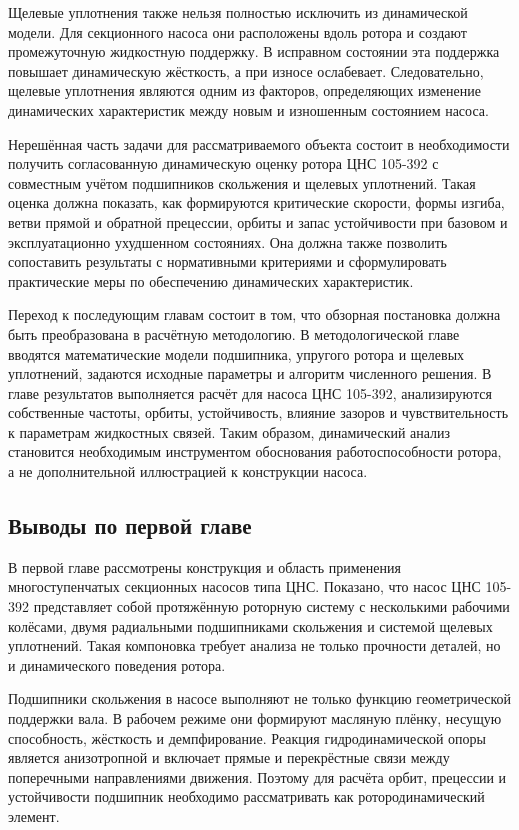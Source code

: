 Щелевые уплотнения также нельзя полностью исключить из динамической модели. Для секционного насоса они расположены вдоль ротора и создают промежуточную жидкостную поддержку. В исправном состоянии эта поддержка повышает динамическую жёсткость, а при износе ослабевает. Следовательно, щелевые уплотнения являются одним из факторов, определяющих изменение динамических характеристик между новым и изношенным состоянием насоса.

Нерешённая часть задачи для рассматриваемого объекта состоит в необходимости получить согласованную динамическую оценку ротора ЦНС 105-392 с совместным учётом подшипников скольжения и щелевых уплотнений. Такая оценка должна показать, как формируются критические скорости, формы изгиба, ветви прямой и обратной прецессии, орбиты и запас устойчивости при базовом и эксплуатационно ухудшенном состояниях. Она должна также позволить сопоставить результаты с нормативными критериями и сформулировать практические меры по обеспечению динамических характеристик.

Переход к последующим главам состоит в том, что обзорная постановка должна быть преобразована в расчётную методологию. В методологической главе вводятся математические модели подшипника, упругого ротора и щелевых уплотнений, задаются исходные параметры и алгоритм численного решения. В главе результатов выполняется расчёт для насоса ЦНС 105-392, анализируются собственные частоты, орбиты, устойчивость, влияние зазоров и чувствительность к параметрам жидкостных связей. Таким образом, динамический анализ становится необходимым инструментом обоснования работоспособности ротора, а не дополнительной иллюстрацией к конструкции насоса.

\subsection{Выводы по первой главе}

В первой главе рассмотрены конструкция и область применения многоступенчатых секционных насосов типа ЦНС. Показано, что насос ЦНС 105-392 представляет собой протяжённую роторную систему с несколькими рабочими колёсами, двумя радиальными подшипниками скольжения и системой щелевых уплотнений. Такая компоновка требует анализа не только прочности деталей, но и динамического поведения ротора.

Подшипники скольжения в насосе выполняют не только функцию геометрической поддержки вала. В рабочем режиме они формируют масляную плёнку, несущую способность, жёсткость и демпфирование. Реакция гидродинамической опоры является анизотропной и включает прямые и перекрёстные связи между поперечными направлениями движения. Поэтому для расчёта орбит, прецессии и устойчивости подшипник необходимо рассматривать как ротородинамический элемент.

